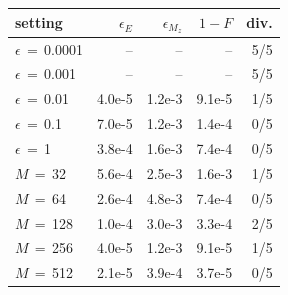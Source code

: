 \begin{tabular}{lrrrr}\toprule
setting & $\epsilon_E$ & $\epsilon_{M_z}$ & $1{-}F$ & div. \\\midrule
$\epsilon$$\,{=}\,$0.0001 & -- & -- & -- & 5/5 \\
$\epsilon$$\,{=}\,$0.001 & -- & -- & -- & 5/5 \\
$\epsilon$$\,{=}\,$0.01 & 4.0e-5 & 1.2e-3 & 9.1e-5 & 1/5 \\
$\epsilon$$\,{=}\,$0.1 & 7.0e-5 & 1.2e-3 & 1.4e-4 & 0/5 \\
$\epsilon$$\,{=}\,$1 & 3.8e-4 & 1.6e-3 & 7.4e-4 & 0/5 \\
\midrule
$M$$\,{=}\,$32 & 5.6e-4 & 2.5e-3 & 1.6e-3 & 1/5 \\
$M$$\,{=}\,$64 & 2.6e-4 & 4.8e-3 & 7.4e-4 & 0/5 \\
$M$$\,{=}\,$128 & 1.0e-4 & 3.0e-3 & 3.3e-4 & 2/5 \\
$M$$\,{=}\,$256 & 4.0e-5 & 1.2e-3 & 9.1e-5 & 1/5 \\
$M$$\,{=}\,$512 & 2.1e-5 & 3.9e-4 & 3.7e-5 & 0/5 \\
\bottomrule\end{tabular}
